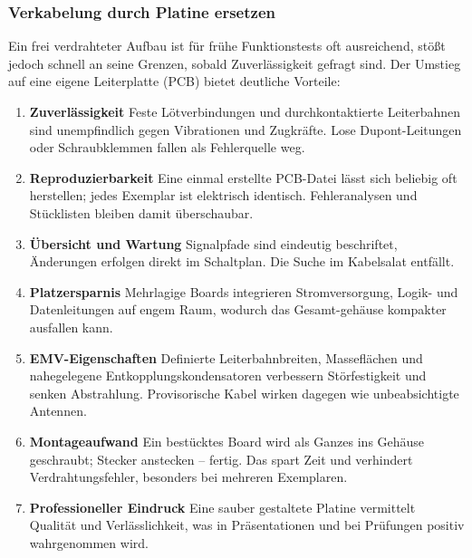 \documentclass[a4paper,12pt]{article}
\begin{document}
\subsubsection{Verkabelung durch Platine ersetzen}

Ein frei verdrahteter Aufbau ist für frühe Funktionstests oft ausreichend, stößt jedoch
schnell an seine Grenzen, sobald Zuverlässigkeit gefragt sind. Der Umstieg auf eine eigene Leiterplatte (PCB) bietet deutliche Vorteile:

\begin{enumerate}
  \item \textbf{Zuverlässigkeit}  
        Feste Lötverbindungen und durchkontaktierte Leiterbahnen sind unempfindlich
        gegen Vibrationen und Zugkräfte. Lose Dupont-Leitungen oder Schraubklemmen
        fallen als Fehlerquelle weg.

  \item \textbf{Reproduzierbarkeit}  
        Eine einmal erstellte PCB-Datei lässt sich beliebig oft herstellen; jedes
        Exemplar ist elektrisch identisch. Fehleranalysen und Stücklisten bleiben
        damit überschaubar.

  \item \textbf{Übersicht und Wartung}  
        Signalpfade sind eindeutig beschriftet, Änderungen erfolgen direkt im
        Schaltplan. Die Suche im Kabelsalat entfällt.

  \item \textbf{Platzersparnis}  
        Mehrlagige Boards integrieren Stromversorgung, Logik- und Datenleitungen
        auf engem Raum, wodurch das Gesamt-gehäuse kompakter ausfallen kann.

  \item \textbf{EMV-Eigenschaften}  
        Definierte Leiterbahnbreiten, Masseflächen und nahegelegene
        Entkopplungskondensatoren verbessern Störfestigkeit und senken
        Abstrahlung. Provisorische Kabel wirken dagegen wie unbeabsichtigte
        Antennen.

  \item \textbf{Montageaufwand}  
        Ein bestücktes Board wird als Ganzes ins Gehäuse geschraubt; Stecker
        anstecken – fertig. Das spart Zeit und verhindert Verdrahtungsfehler,
        besonders bei mehreren Exemplaren.

  \item \textbf{Professioneller Eindruck}  
        Eine sauber gestaltete Platine vermittelt Qualität und Verlässlichkeit,
        was in Präsentationen und bei Prüfungen positiv wahrgenommen wird.
\end{enumerate}
\end{document}
